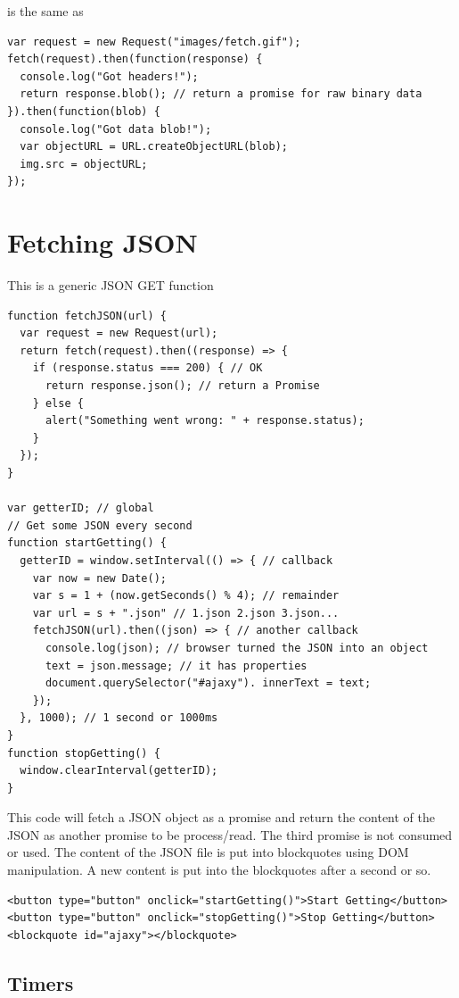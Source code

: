 \documentclass[../CMPUT-404-Notes.tex]{subfiles}
\begin{document}
is the same as 

\begin{verbatim}
var request = new Request("images/fetch.gif");
fetch(request).then(function(response) {
  console.log("Got headers!");
  return response.blob(); // return a promise for raw binary data
}).then(function(blob) {
  console.log("Got data blob!");
  var objectURL = URL.createObjectURL(blob);
  img.src = objectURL;
});
\end{verbatim}


\section{Fetching JSON}
This is a generic JSON GET function
\begin{verbatim}
function fetchJSON(url) {
  var request = new Request(url);
  return fetch(request).then((response) => {
    if (response.status === 200) { // OK
      return response.json(); // return a Promise
    } else {
      alert("Something went wrong: " + response.status);
    }
  });
}

var getterID; // global
// Get some JSON every second
function startGetting() {
  getterID = window.setInterval(() => { // callback
    var now = new Date();
    var s = 1 + (now.getSeconds() % 4); // remainder
    var url = s + ".json" // 1.json 2.json 3.json...
    fetchJSON(url).then((json) => { // another callback
      console.log(json); // browser turned the JSON into an object
      text = json.message; // it has properties
      document.querySelector("#ajaxy"). innerText = text;
    });
  }, 1000); // 1 second or 1000ms
}
function stopGetting() {
  window.clearInterval(getterID);
}
\end{verbatim}

This code will fetch a JSON object as a promise and return the content of the JSON as another promise to be process/read. The third promise is not consumed or used. 
The content of the JSON file is put into blockquotes using DOM manipulation.
A new content is put into the blockquotes after a second or so.

\begin{verbatim}
<button type="button" onclick="startGetting()">Start Getting</button>
<button type="button" onclick="stopGetting()">Stop Getting</button>
<blockquote id="ajaxy"></blockquote>
\end{verbatim}

\subsection{Timers}
\end{document}
